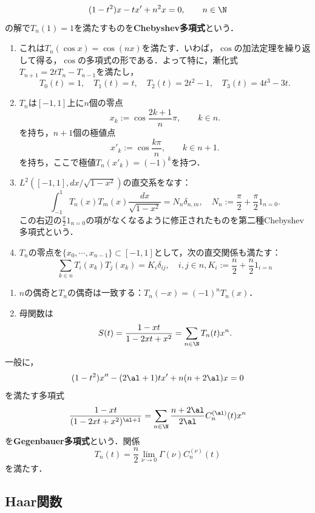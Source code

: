 \documentclass[uplatex,dvipdfmx]{jsreport}
\begin{document}
\begin{problem}
    \[(1-t^2)x-tx'+n^2x=0,\qquad n\in\N\]
    の解で$T_n(1)=1$を満たすものを\textbf{Chebyshev多項式}という．
    \begin{enumerate}
        \item これは$T_n(\cos x)=\cos(n x)$を満たす．いわば，$\cos$の加法定理を繰り返して得る，$\cos$の多項式の形である．よって特に，漸化式$T_{n+1}=2tT_n-T_{n-1}$を満たし，
        \[T_0(t)=1,\quad T_1(t)=t,\quad T_2(t)=2t^2-1,\quad T_3(t)=4t^3-3t.\]
        \item $T_n$は$[-1,1]$上に$n$個の零点
        \[x_k:=\cos\frac{2k+1}{n}\pi,\qquad k\in n.\]
        を持ち，$n+1$個の極値点
        \[x'_k:=\cos\frac{k\pi}{n},\qquad k\in n+1.\]
        を持ち，ここで極値$T_n(x'_k)=(-1)^k$を持つ．
        \item $L^2([-1,1],dx/\sqrt{1-x^2})$の直交系をなす：
        \[\int^1_{-1}T_n(x)T_m(x)\frac{dx}{\sqrt{1-x^2}}=N_n\delta_{n,m},\quad N_n:=\frac{\pi}{2}+\frac{\pi}{2}1_{n=0}.\]
        この右辺の$\frac{\pi}{2}1_{n=0}$の項がなくなるように修正されたものを第二種Chebyshev多項式という．
        \item $T_n$の零点を$\{x_0,\cdots,x_{n-1}\}\subset[-1,1]$として，次の直交関係も満たす：
        \[\sum_{k\in n}T_i(x_k)T_j(x_k)=K_i\delta_{ij},\quad i,j\in n,K_i:=\frac{n}{2}+\frac{n}{2}1_{i=n}\]
    \end{enumerate}
\end{problem}

\begin{proposition}\mbox{}
    \begin{enumerate}
        \item $n$の偶奇と$T_n$の偶奇は一致する：$T_n(-x)=(-1)^nT_n(x)$．
        \item 母関数は
        \[S(t)=\frac{1-xt}{1-2xt+x^2}=\sum_{n\in\N}T_n(t)x^n.\]
    \end{enumerate}
\end{proposition}

\begin{remarks}
    一般に，
    \[(1-t^2)x''-(2\al+1)tx'+n(n+2\al)x=0\]
    を満たす多項式
    \[\frac{1-xt}{(1-2xt+x^2)^{\al+1}}=\sum_{n\in\N}\frac{n+2\al}{2\al}C_n^{(\al)}(t)x^n\]
    を\textbf{Gegenbauer多項式}という．関係
    \[T_n(t)=\frac{n}{2}\lim_{\nu\to0}\Gamma(\nu)C^{(\nu)}_n(t)\]
    を満たす．
\end{remarks}

\subsection{Haar関数}
\end{document}
